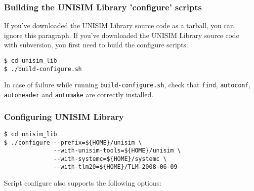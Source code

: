 \subsubsection{Building the UNISIM Library 'configure' scripts}

If you've downloaded the UNISIM Library source code as a tarball, you can ignore this paragraph.
If you've downloaded the UNISIM Library source code with subversion, you first need to build the configure scripts:

\begin{verbatim}
$ cd unisim_lib
$ ./build-configure.sh
\end{verbatim}

In case of failure while running \texttt{build-configure.sh}, check that \texttt{find}, \texttt{autoconf}, \texttt{autoheader} and \texttt{automake} are correctly installed.

\subsubsection{Configuring UNISIM Library}

\begin{verbatim}
$ cd unisim_lib
$ ./configure --prefix=${HOME}/unisim \
              --with-unisim-tools=${HOME}/unisim \
              --with-systemc=${HOME}/systemc \
              --with-tlm20=${HOME}/TLM-2008-06-09
\end{verbatim}

Script configure also supports the following options:

